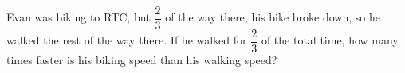 Evan was biking to RTC, but $\dfrac{2}{3}$ of the way there, his bike broke down, so he walked the rest of the way there. If he walked for  $\dfrac{2}{3}$ of the total time, how many times faster is his biking speed than his walking speed?
